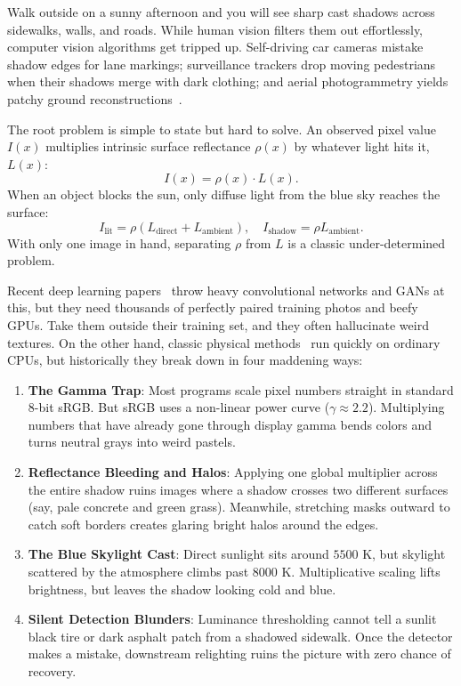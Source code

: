 \documentclass[10pt,twocolumn,letterpaper]{article}
\begin{document}
Walk outside on a sunny afternoon and you will see sharp cast shadows across sidewalks, walls, and roads. While human vision filters them out effortlessly, computer vision algorithms get tripped up. Self-driving car cameras mistake shadow edges for lane markings; surveillance trackers drop moving pedestrians when their shadows merge with dark clothing; and aerial photogrammetry yields patchy ground reconstructions~\cite{hu2019direction,vicente2016leave}. 

The root problem is simple to state but hard to solve. An observed pixel value $I(x)$ multiplies intrinsic surface reflectance $\rho(x)$ by whatever light hits it, $L(x)$:
\begin{equation}
I(x) = \rho(x) \cdot L(x).
\label{eq:image_formation}
\end{equation}
When an object blocks the sun, only diffuse light from the blue sky reaches the surface:
\begin{equation}
I_{\text{lit}} = \rho (L_{\text{direct}} + L_{\text{ambient}}), \quad I_{\text{shadow}} = \rho L_{\text{ambient}}.
\end{equation}
With only one image in hand, separating $\rho$ from $L$ is a classic under-determined problem.

Recent deep learning papers~\cite{wang2018stacked} throw heavy convolutional networks and GANs at this, but they need thousands of perfectly paired training photos and beefy GPUs. Take them outside their training set, and they often hallucinate weird textures. On the other hand, classic physical methods~\cite{guo2012paired,finlayson2005removal} run quickly on ordinary CPUs, but historically they break down in four maddening ways:
\begin{enumerate}
    \item \textbf{The Gamma Trap}: Most programs scale pixel numbers straight in standard 8-bit sRGB. But sRGB uses a non-linear power curve ($\gamma \approx 2.2$). Multiplying numbers that have already gone through display gamma bends colors and turns neutral grays into weird pastels.
    \item \textbf{Reflectance Bleeding and Halos}: Applying one global multiplier across the entire shadow ruins images where a shadow crosses two different surfaces (say, pale concrete and green grass). Meanwhile, stretching masks outward to catch soft borders creates glaring bright halos around the edges.
    \item \textbf{The Blue Skylight Cast}: Direct sunlight sits around $5500\text{ K}$, but skylight scattered by the atmosphere climbs past $8000\text{ K}$. Multiplicative scaling lifts brightness, but leaves the shadow looking cold and blue.
    \item \textbf{Silent Detection Blunders}: Luminance thresholding cannot tell a sunlit black tire or dark asphalt patch from a shadowed sidewalk. Once the detector makes a mistake, downstream relighting ruins the picture with zero chance of recovery.
\end{enumerate}
\end{document}

